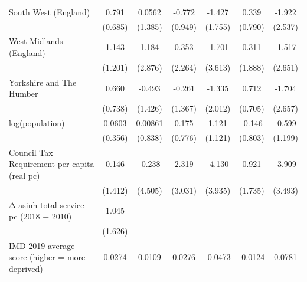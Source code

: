\begin{table}[htbp]
\begin{tabular}{l*{6}{c}}
\addlinespace
South West (England)&       0.791         &      0.0562         &      -0.772         &      -1.427         &       0.339         &      -1.922         \\
                    &     (0.685)         &     (1.385)         &     (0.949)         &     (1.755)         &     (0.790)         &     (2.537)         \\
\addlinespace
West Midlands (England)&       1.143         &       1.184         &       0.353         &      -1.701         &       0.311         &      -1.517         \\
                    &     (1.201)         &     (2.876)         &     (2.264)         &     (3.613)         &     (1.888)         &     (2.651)         \\
\addlinespace
Yorkshire and The Humber&       0.660         &      -0.493         &      -0.261         &      -1.335         &       0.712         &      -1.704         \\
                    &     (0.738)         &     (1.426)         &     (1.367)         &     (2.012)         &     (0.705)         &     (2.657)         \\
\addlinespace
log(population)     &      0.0603         &     0.00861         &       0.175         &       1.121         &      -0.146         &      -0.599         \\
                    &     (0.356)         &     (0.838)         &     (0.776)         &     (1.121)         &     (0.803)         &     (1.199)         \\
\addlinespace
Council Tax Requirement per capita (real pc)&       0.146         &      -0.238         &       2.319         &      -4.130         &       0.921         &      -3.909         \\
                    &     (1.412)         &     (4.505)         &     (3.031)         &     (3.935)         &     (1.735)         &     (3.493)         \\
\addlinespace
Δ asinh total service pc (2018 − 2010)&       1.045         &                     &                     &                     &                     &                     \\
                    &     (1.626)         &                     &                     &                     &                     &                     \\
\addlinespace
IMD 2019 average score (higher = more deprived)&      0.0274         &      0.0109         &      0.0276         &     -0.0473         &     -0.0124         &      0.0781         \\

\end{tabular}
\end{table}
